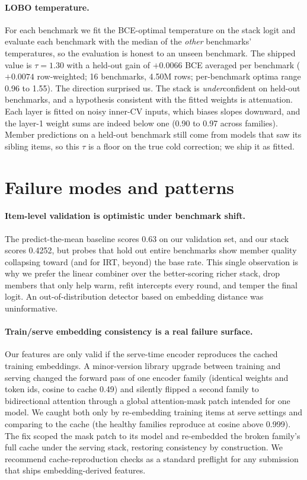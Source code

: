 \documentclass{article}
\begin{document}
\paragraph{LOBO temperature.}
For each benchmark we fit the BCE-optimal temperature on the stack logit and evaluate each benchmark with the median of the \emph{other} benchmarks' temperatures, so the evaluation is honest to an unseen benchmark. The shipped value is $\tau=1.30$ with a held-out gain of $+0.0066$ BCE averaged per benchmark ($+0.0074$ row-weighted; 16 benchmarks, 4.50M rows; per-benchmark optima range 0.96 to 1.55). The direction surprised us. The stack is \emph{under}confident on held-out benchmarks, and a hypothesis consistent with the fitted weights is attenuation. Each layer is fitted on noisy inner-CV inputs, which biases slopes downward, and the layer-1 weight sums are indeed below one (0.90 to 0.97 across families). Member predictions on a held-out benchmark still come from models that saw its sibling items, so this $\tau$ is a floor on the true cold correction; we ship it as fitted.

\section{Failure modes and patterns}

\paragraph{Item-level validation is optimistic under benchmark shift.}
The predict-the-mean baseline scores 0.63 on our validation set, and our stack scores 0.4252, but probes that hold out entire benchmarks show member quality collapsing toward (and for IRT, beyond) the base rate. This single observation is why we prefer the linear combiner over the better-scoring richer stack, drop members that only help warm, refit intercepts every round, and temper the final logit. An out-of-distribution detector based on embedding distance was uninformative.

\paragraph{Train/serve embedding consistency is a real failure surface.}
Our features are only valid if the serve-time encoder reproduces the cached training embeddings. A minor-version library upgrade between training and serving changed the forward pass of one encoder family (identical weights and token ids, cosine to cache 0.49) and silently flipped a second family to bidirectional attention through a global attention-mask patch intended for one model. We caught both only by re-embedding training items at serve settings and comparing to the cache (the healthy families reproduce at cosine above 0.999). The fix scoped the mask patch to its model and re-embedded the broken family's full cache under the serving stack, restoring consistency by construction. We recommend cache-reproduction checks as a standard preflight for any submission that ships embedding-derived features.
\end{document}
